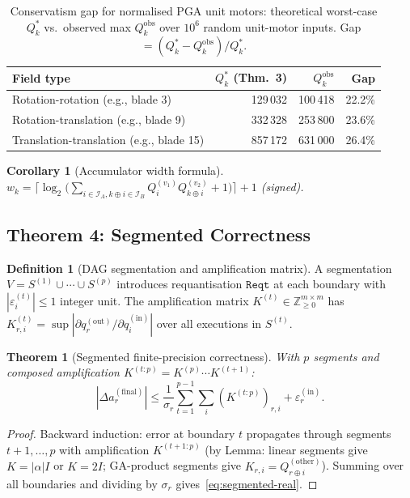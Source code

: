 \documentclass[11pt,a4paper]{article}
\theoremstyle{definition}
\newtheorem{definition}{Definition}[section]
\theoremstyle{plain}
\newtheorem{theorem}{Theorem}[section]
\newtheorem{corollary}{Corollary}[section]
\theoremstyle{remark}
\begin{document}
\begin{table}[h]
\centering
\caption{Conservatism gap for normalised PGA unit motors:
theoretical worst-case $Q_k^*$ vs.\ observed max $Q_k^{\mathrm{obs}}$
over $10^6$ random unit-motor inputs.
Gap $= (Q_k^* - Q_k^{\mathrm{obs}})/Q_k^*$.}
\label{tab:constraint-gap}
\small
\begin{tabular}{lrrr}
\toprule
Field type & $Q_k^*$ (Thm.~3) & $Q_k^{\mathrm{obs}}$ & Gap \\
\midrule
Rotation-rotation (e.g., blade 3) & 129\,032 & 100\,418 & 22.2\% \\
Rotation-translation (e.g., blade 9) & 332\,328 & 253\,800 & 23.6\% \\
Translation-translation (e.g., blade 15) & 857\,172 & 631\,000 & 26.4\% \\
\bottomrule
\end{tabular}
\end{table}

\begin{corollary}[Accumulator width formula]
\label{cor:accum}
$w_k = \bigl\lceil\log_2\bigl(\sum_{i\in\mathcal{I}_A,k\oplus i\in\mathcal{I}_B}
Q_i^{(v_1)}Q_{k\oplus i}^{(v_2)}+1\bigr)\bigr\rceil+1$ (signed).
\end{corollary}

\subsection{Theorem 4: Segmented Correctness}
\label{sec:segmented}

\begin{definition}[DAG segmentation and amplification matrix]
A segmentation $V=S^{(1)}\cup\cdots\cup S^{(p)}$ introduces requantisation
$\mathtt{Reqt}$ at each boundary with $|\varepsilon_i^{(t)}|\le 1$ integer unit.
The amplification matrix $K^{(t)}\in\mathbb{Z}_{\ge0}^{m\times m}$ has
$K^{(t)}_{r,i}=\sup|\partial q_r^{(\mathrm{out})}/\partial q_i^{(\mathrm{in})}|$
over all executions in $S^{(t)}$.
\end{definition}

\begin{theorem}[Segmented finite-precision correctness]
\label{thm:segmented}
With $p$ segments and composed amplification $K^{(t:p)}=K^{(p)}\cdots K^{(t+1)}$:
\begin{equation}\label{eq:segmented-real}
  |\Delta a_r^{(\mathrm{final})}|
  \le \frac{1}{\sigma_r}\sum_{t=1}^{p-1}\sum_i (K^{(t:p)})_{r,i}
  + \varepsilon_r^{(\mathrm{in})}.
\end{equation}
\end{theorem}
\begin{proof}
Backward induction: error at boundary $t$ propagates through
segments $t+1,\ldots,p$ with amplification $K^{(t+1:p)}$
(by Lemma: linear segments give $K=|\alpha|I$ or $K=2I$;
GA-product segments give $K_{r,i}=Q_{r\oplus i}^{(\mathrm{other})}$).
Summing over all boundaries and dividing by $\sigma_r$ gives~\eqref{eq:segmented-real}.
\end{proof}
\end{document}
